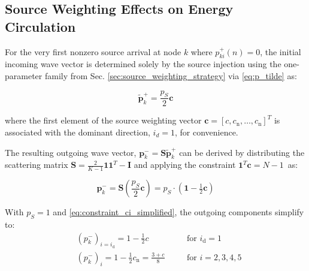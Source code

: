 \documentclass[journal]{IEEEtran}
\begin{document}

\subsection{Source Weighting Effects on Energy Circulation}
\label{sec:source_weighting_analysis}

For the very first nonzero source arrival at node $k$ where $p_{ki}^{+}(n)= 0$, the initial incoming wave vector is determined solely by the source injection using the one-parameter family from Sec. \ref{sec:source_weighting_strategy} via \eqref{eq:p_tilde} as:

\begin{equation}
\label{eq:p_injection}
\mathbf{\tilde p}_{k}^{+} = \frac{p_S}{2} \mathbf{c}
\end{equation}

where the first element of the source weighting vector \(\mathbf{c} = [c, c_{\text{n}}, \ldots ,c_{\text{n}}]^T\) is associated with the dominant direction, $i_d=1$, for convenience. 

The resulting outgoing wave vector, $\mathbf{p}_k^- = \mathbf{S}\mathbf{\tilde p}_{k}^+$ can be derived by distributing the scattering matrix $\mathbf{S} = \frac{2}{K-1} \mathbf{11}^T - \mathbf{I}$ and applying the constraint $\mathbf{1}^T \mathbf{c}  = N - 1$\ as:

\begin{equation}
\mathbf{p}_{k}^{-} = \mathbf{S}\left(\frac{p_S}{2}\mathbf{c}\right) 
= p_S \cdot(\mathbf{1} - \tfrac{1}{2}\mathbf{c}) 
\end{equation}



With $p_S = 1$ and \eqref{eq:constraint_ci_simplified}, the outgoing components simplify to:
\begin{equation}
\label{eq:pk_minus_dom}
\begin{aligned}
&(p_k^-)_{i=i_{\text{d}}} = 1-\frac{1}{2}c && \text{for } i_{\text{d}}=1 \\
&(p_k^-)_i = 1 - \frac{1}{2}c_{\text{n}} = \frac{3 + c}{8} \quad &&\text{for } i = 2, 3, 4, 5
\end{aligned}
\end{equation}
\end{document}
